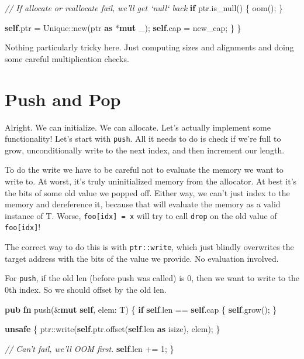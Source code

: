 \documentclass[a4paper,]{book}
\newenvironment{Shaded}{\begin{snugshade}}{\end{snugshade}}
\newcommand{\KeywordTok}[1]{\textcolor[rgb]{0.13,0.29,0.53}{\textbf{{#1}}}}
\newcommand{\DecValTok}[1]{\textcolor[rgb]{0.00,0.00,0.81}{{#1}}}
\newcommand{\CommentTok}[1]{\textcolor[rgb]{0.56,0.35,0.01}{\textit{{#1}}}}
\newcommand{\NormalTok}[1]{{#1}}
\begin{document}
\begin{Shaded}
\begin{Highlighting}[]
        \CommentTok{// If allocate or reallocate fail, we'll get `null` back}
        \KeywordTok{if} \NormalTok{ptr.is_null() \{ oom(); \}}

        \KeywordTok{self}\NormalTok{.ptr = Unique::new(ptr }\KeywordTok{as} \NormalTok{*}\KeywordTok{mut} \NormalTok{_);}
        \KeywordTok{self}\NormalTok{.cap = new_cap;}
    \NormalTok{\}}
\NormalTok{\}}
\end{Highlighting}
\end{Shaded}

Nothing particularly tricky here. Just computing sizes and alignments
and doing some careful multiplication checks.

\section{Push and Pop}\label{sec--vec-push-pop}

Alright. We can initialize. We can allocate. Let's actually implement
some functionality! Let's start with \texttt{push}. All it needs to do
is check if we're full to grow, unconditionally write to the next index,
and then increment our length.

To do the write we have to be careful not to evaluate the memory we want
to write to. At worst, it's truly uninitialized memory from the
allocator. At best it's the bits of some old value we popped off. Either
way, we can't just index to the memory and dereference it, because that
will evaluate the memory as a valid instance of T. Worse,
\texttt{foo{[}idx{]}\ =\ x} will try to call \texttt{drop} on the old
value of \texttt{foo{[}idx{]}}!

The correct way to do this is with \texttt{ptr::write}, which just
blindly overwrites the target address with the bits of the value we
provide. No evaluation involved.

For \texttt{push}, if the old len (before push was called) is 0, then we
want to write to the 0th index. So we should offset by the old len.

\begin{Shaded}
\begin{Highlighting}[]
\KeywordTok{pub} \KeywordTok{fn} \NormalTok{push(&}\KeywordTok{mut} \KeywordTok{self}\NormalTok{, elem: T) \{}
    \KeywordTok{if} \KeywordTok{self}\NormalTok{.len == }\KeywordTok{self}\NormalTok{.cap \{ }\KeywordTok{self}\NormalTok{.grow(); \}}

    \KeywordTok{unsafe} \NormalTok{\{}
        \NormalTok{ptr::write(}\KeywordTok{self}\NormalTok{.ptr.offset(}\KeywordTok{self}\NormalTok{.len }\KeywordTok{as} \NormalTok{isize), elem);}
    \NormalTok{\}}

    \CommentTok{// Can't fail, we'll OOM first.}
    \KeywordTok{self}\NormalTok{.len += }\DecValTok{1}\NormalTok{;}
\NormalTok{\}}
\end{Highlighting}
\end{Shaded}
\end{document}
